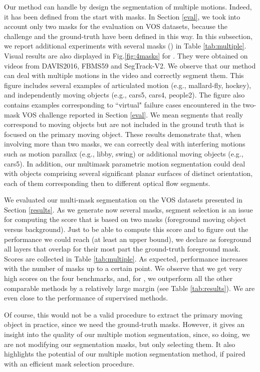 \documentclass[10pt,twocolumn,letterpaper]{article}
\begin{document}
Our method can handle by design the segmentation of multiple motions. Indeed, it has been defined from the start with  masks. In Section \ref{eval}, we took into account only two masks for the evaluation on VOS datasets, because the challenge and the ground-truth have been defined in this way. In this subsection, we report additional experiments with {\color{black} several masks () in Table \ref{tab:multiple}. Visual results are also displayed in Fig.\ref{fig:4masks} for }. They were obtained on videos from DAVIS2016, FBMS59 and SegTrack-V2. We observe that our method can deal with multiple motions in the video and correctly segment them. This figure includes several examples of articulated motion (e.g., mallard-fly, hockey), and independently moving objects (e.g., cars5, cars4, people2). The figure also contains examples corresponding to ``virtual" failure cases encountered in the two-mask VOS challenge reported in Section \ref{eval}. We mean segments that really correspond to moving objects but are not included in the ground truth that is focused on the primary moving object.
These results demonstrate that, when involving {\color{black} more than two} masks, we can correctly deal with interfering motions such as motion parallax (e.g., libby, swing) or additional moving objects (e.g., cars5). {\color{black} In addition, our multimask parametric motion segmentation could deal with objects comprising several significant planar surfaces of distinct orientation, each of them corresponding then to different optical flow segments.}

{\color{black} We evaluated our multi-mask segmentation on the VOS datasets presented in Section \ref{results}}. As we generate now several masks, segment selection is an issue for computing the  score that is based on two masks (foreground moving object versus background). Just to be able to compute this score and to figure out the performance we could reach (at least an upper bound), we declare as foreground all layers that overlap for their most part the ground-truth foreground mask. Scores are collected in Table \ref{tab:multiple}. {\color{black} As expected, performance increases with the number of masks up to a certain point.} We observe that we get very high scores on the four benchmarks, {\color{black} and, for , we outperform} all the other comparable methods by a relatively large margin (see Table \ref{tab:results}). We are even close to the performance of supervised methods.

Of course, this would not be a valid procedure to extract the primary moving object in practice, since we need the ground-truth masks. However, it gives an insight into the quality of our multiple motion segmentation, since, so doing, we are not modifying our segmentation masks, but only selecting them. It also highlights the potential of our multiple motion segmentation method, if paired with an efficient mask selection procedure.
\end{document}
